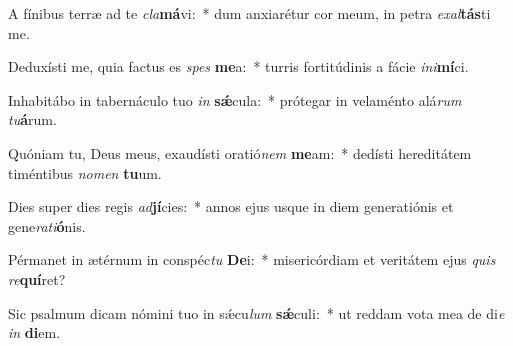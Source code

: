 \item A fínibus terræ ad te \textit{cla}\textbf{má}vi:~* dum anxiarétur cor meum, in petra \textit{ex}\textit{al}\textbf{tás}ti me.
\item Deduxísti me, quia factus es \textit{spes} \textbf{me}a:~* turris fortitúdinis a fácie \textit{in}\textit{i}\textbf{mí}ci.
\item Inhabitábo in tabernáculo tuo \textit{in} \textbf{sǽ}cula:~* prótegar in velaménto alá\textit{rum} \textit{tu}\textbf{á}rum.
\item Quóniam tu, Deus meus, exaudísti oratió\textit{nem} \textbf{me}am:~* dedísti hereditátem timéntibus \textit{no}\textit{men} \textbf{tu}um.
\item Dies super dies regis \textit{ad}\textbf{jí}cies:~* annos ejus usque in diem generatiónis et gene\textit{ra}\textit{ti}\textbf{ó}nis.
\item Pérmanet in ætérnum in conspéc\textit{tu} \textbf{De}i:~* misericórdiam et veritátem ejus \textit{quis} \textit{re}\textbf{quí}ret?
\item Sic psalmum dicam nómini tuo in sǽcu\textit{lum} \textbf{sǽ}culi:~* ut reddam vota mea de di\textit{e} \textit{in} \textbf{di}em.
